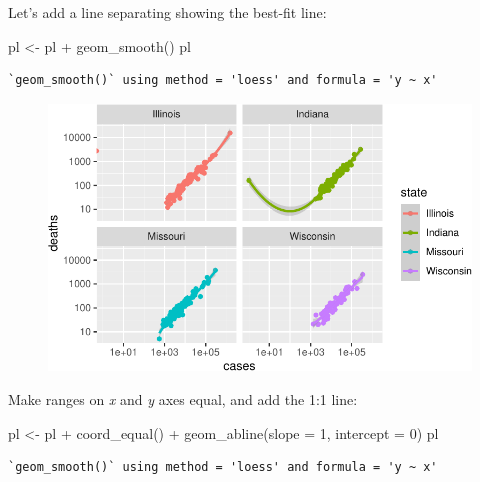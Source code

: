 \documentclass[
  letterpaper,
  DIV=11,
  numbers=noendperiod]{scrreprt}
\newenvironment{Shaded}{\begin{snugshade}}{\end{snugshade}}
\newcommand{\AttributeTok}[1]{\textcolor[rgb]{0.40,0.45,0.13}{#1}}
\newcommand{\DecValTok}[1]{\textcolor[rgb]{0.68,0.00,0.00}{#1}}
\newcommand{\FunctionTok}[1]{\textcolor[rgb]{0.28,0.35,0.67}{#1}}
\newcommand{\NormalTok}[1]{\textcolor[rgb]{0.00,0.23,0.31}{#1}}
\newcommand{\OtherTok}[1]{\textcolor[rgb]{0.00,0.23,0.31}{#1}}
\newcommand{\SpecialCharTok}[1]{\textcolor[rgb]{0.37,0.37,0.37}{#1}}
\begin{document}
Let's add a line separating showing the best-fit line:

\begin{Shaded}
\begin{Highlighting}[]
\NormalTok{pl }\OtherTok{\textless{}{-}}\NormalTok{ pl }\SpecialCharTok{+} \FunctionTok{geom\_smooth}\NormalTok{()}
\NormalTok{pl}
\end{Highlighting}
\end{Shaded}

\begin{verbatim}
`geom_smooth()` using method = 'loess' and formula = 'y ~ x'
\end{verbatim}

\begin{figure}[H]

{\centering \includegraphics{./01-dataviz_files/figure-pdf/unnamed-chunk-23-1.pdf}

}

\end{figure}

Make ranges on \emph{x} and \emph{y} axes equal, and add the 1:1 line:

\begin{Shaded}
\begin{Highlighting}[]
\NormalTok{pl }\OtherTok{\textless{}{-}}\NormalTok{ pl }\SpecialCharTok{+} \FunctionTok{coord\_equal}\NormalTok{() }\SpecialCharTok{+} \FunctionTok{geom\_abline}\NormalTok{(}\AttributeTok{slope =} \DecValTok{1}\NormalTok{, }\AttributeTok{intercept =} \DecValTok{0}\NormalTok{)}
\NormalTok{pl}
\end{Highlighting}
\end{Shaded}

\begin{verbatim}
`geom_smooth()` using method = 'loess' and formula = 'y ~ x'
\end{verbatim}
\end{document}
